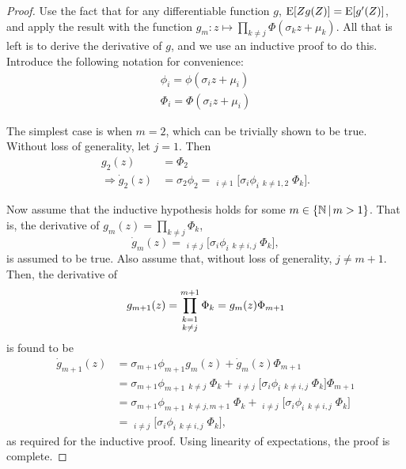 \begin{proof}
  Use the fact that for any differentiable function $g$, $\operatorname{E}[Zg(Z)] = \operatorname{E}[g'(Z)]$, and apply the result with the function $g_m:z \mapsto \prod_{k \neq j} \Phi(\sigma_k z + \mu_k)$. All that is left is to derive the derivative of $g$, and we use an inductive proof to do this. 
  Introduce the following notation for convenience:
  \begin{align*}
    \phi_i = \phi(\sigma_i z + \mu_i) \\
    \Phi_i = \Phi(\sigma_i z + \mu_i) 
  \end{align*}
  
  The simplest case is when $m=2$, which can be trivially shown to be true. Without loss of generality, let $j=1$. Then
  \begin{align*}
    g_2(z) &= \Phi_2 \\
    \Rightarrow \dot g_2(z) &= \sigma_2 \phi_2 = \mathop{\sum_{i=1}^2}_{i \neq 1} \Bigg[ \sigma_i \phi_i \mathop{\sum_{k=1}^2}_{k \neq 1,2} \Phi_k \Bigg].
  \end{align*}
  
  Now assume that the inductive hypothesis holds for some $m \in \{\mathbb{N} \, | \, m > 1\}$. 
  That is, the derivative of $g_m(z) = \prod_{k \neq j} \Phi_k$, 
  \[
    \dot{g}_m(z) = \mathop{\sum_{i=1}^m}_{i \neq j} \bigg[  \sigma_i \phi_i \mathop{\prod_{k=1}^m}_{k \neq i,j} \Phi_k \bigg],
  \]
  is assumed to be true. 
  Also assume that, without loss of generality, $j \neq m+1$.
  Then, the derivative of
  \[
    g_{m+1}(z) = \mathop{\prod_{k=1}^{m+1}}_{k \neq j} \Phi_k = g_m(z) \Phi_{m+1}
    \vspace{-0.5em}
  \]
  \vspace{-0.5em}is found to be
  \begin{align*}
    \dot g_{m+1}(z) &= \sigma_{m+1} \phi_{m+1} g_m(z) + \dot g_m(z) \Phi_{m+1} \\
    &= \sigma_{m+1} \phi_{m+1} \mathop{\prod_{k=1}^m}_{k \neq j} \Phi_k + \mathop{\sum_{i=1}^m}_{i \neq j} \bigg[  \sigma_i \phi_i \mathop{\prod_{k=1}^m}_{k \neq i,j} \Phi_k \bigg] \Phi_{m+1} \\
    &= \sigma_{m+1} \phi_{m+1} \mathop{\prod_{k=1}^{m+1}}_{k \neq j, m+1} \Phi_k + \mathop{\sum_{i=1}^m}_{i \neq j} \bigg[  \sigma_i \phi_i \mathop{\prod_{k=1}^{m+1}}_{k \neq i,j} \Phi_k \bigg] \\
    &= \mathop{\sum_{i=1}^{m+1}}_{i \neq j} \bigg[  \sigma_i \phi_i \mathop{\prod_{k=1}^{m+1}}_{k \neq i,j} \Phi_k \bigg],
  \end{align*}
  as required for the inductive proof.
  Using linearity of expectations, the proof is complete.
\end{proof}

